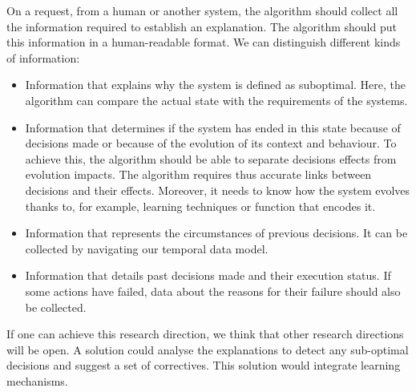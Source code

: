 On a request, from a human or another system, the algorithm should collect all the information required to establish an explanation.
The algorithm should put this information in a human-readable format.
We can distinguish different kinds of information:
\begin{itemize}
	\item Information that explains why the system is defined as suboptimal. Here, the algorithm can compare the actual state  with the requirements of the systems.
	\item Information that determines if the system has ended in this state because of decisions made or because of the evolution of its context and behaviour. To achieve this, the algorithm should be able to separate decisions effects from evolution impacts. The algorithm requires thus accurate links between decisions and their effects. Moreover, it needs to know how the system evolves thanks to, for example, learning techniques or function that encodes it.
	\item Information that represents the circumstances of previous decisions. It can be collected by navigating our temporal data model.
	\item Information that details past decisions made and their execution status. If some actions have failed, data about the reasons for their failure should also be collected.
\end{itemize}

If one can achieve this research direction, we think that other research directions will be open.
A solution could analyse the explanations to detect any sub-optimal decisions and suggest a set of correctives.
This solution would integrate learning mechanisms.





